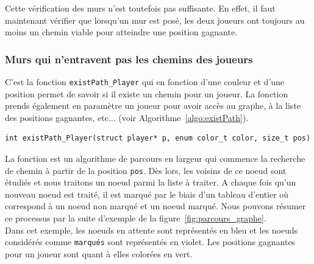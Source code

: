 \documentclass[a4paper]{article}
\begin{document}
Cette vérification des murs n'est toutefois pas suffisante. En effet, il faut maintenant vérifier que lorsqu'un mur est posé, les deux joueurs ont toujours au moins un chemin viable pour atteindre une position gagnante. \\

\subsubsection{Murs qui n'entravent pas les chemins des joueurs}

C'est la fonction \texttt{existPath\_Player} qui en fonction d'une couleur et d'une position permet de savoir si il existe un chemin pour un joueur. La fonction prends également en paramètre un joueur pour avoir accès au graphe, à la liste des positions gagnantes, etc... (voir Algorithme~\ref{algo:existPath}).

\begin{lstlisting}[caption = {Spécification de la fonction déterminant l'existence d'un chemin}, label = {algo:existPath}, float = h]
int existPath_Player(struct player* p, enum color_t color, size_t pos)
\end{lstlisting}

La fonction est un algorithme de parcours en largeur qui commence la recherche de chemin à partir de la position \texttt{pos}. Dès lors, les voisins de ce noeud sont étudiés et nous traitons un noeud parmi la liste à traiter. A chaque fois qu'un nouveau noeud est traité, il est marqué par le biais d'un tableau d'entier où  correspond à un noeud non marqué et  un noeud marqué. Nous pouvons résumer ce processus par la suite d'exemple de la figure~\ref{fig:parcours_graphe}. \\

Dans cet exemple, les noeuds en attente sont représentés en bleu et les noeuds considérés comme \texttt{marqués} sont représentés en violet. Les positions gagnantes pour un joueur sont quant à elles colorées en vert. \\

\clearpage
\end{document}
